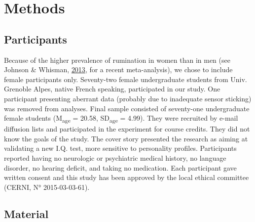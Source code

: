 \documentclass[a4paper,12pt,twoside,openright,oldfontcommands]{memoir}
\begin{document}
\hypertarget{methods}{%
\section{Methods}\label{methods}}

\hypertarget{participants}{%
\subsection{Participants}\label{participants}}

Because of the higher prevalence of rumination in women than in men (see Johnson \& Whisman, \protect\hyperlink{ref-Johnson2013}{2013}, for a recent meta-analysis), we chose to include female participants only. Seventy-two female undergraduate students from Univ. Grenoble Alpes, native French speaking, participated in our study. One participant presenting aberrant data (probably due to inadequate sensor sticking) was removed from analyses. Final sample consisted of seventy-one undergraduate female students (M\textsubscript{age} = 20.58, SD\textsubscript{age} = 4.99). They were recruited by e-mail diffusion lists and participated in the experiment for course credits. They did not know the goals of the study. The cover story presented the research as aiming at validating a new I.Q. test, more sensitive to personality profiles. Participants reported having no neurologic or psychiatric medical history, no language disorder, no hearing deficit, and taking no medication. Each participant gave written consent and this study has been approved by the local ethical committee (CERNI, N° 2015-03-03-61).

\hypertarget{material}{%
\subsection{Material}\label{material}}
\end{document}
